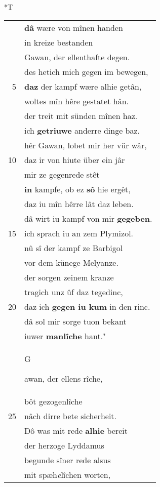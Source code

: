 \documentclass[8pt,a4paper,notitlepage]{article}
\begin{document}
\begin{table}[ht]
\hspace{0.5cm}
\begin{minipage}[t]{0.5\linewidth}
\small
\begin{center}*T
\end{center}
\begin{tabular}{rl}
 & \textbf{dâ} wære von mînen handen\\ 
 & in kreize bestanden\\ 
 & Gawan, der ellenthafte degen.\\ 
 & des hetich mich gegen im bewegen,\\ 
5 & \textbf{daz} der kampf wære alhie getân,\\ 
 & woltes mîn hêre gestatet hân.\\ 
 & der treit mit sünden mînen haz.\\ 
 & ich \textbf{getriuwe} anderre dinge baz.\\ 
 & hêr Gawan, lobet mir her vür wâr,\\ 
10 & daz ir von hiute über ein jâr\\ 
 & mir ze gegenrede stêt\\ 
 & \textbf{in} kampfe, ob ez \textbf{sô} hie ergêt,\\ 
 & daz iu mîn hêrre lât daz leben.\\ 
 & dâ wirt iu kampf von mir \textbf{gegeben}.\\ 
15 & ich sprach iu an zem Plymizol.\\ 
 & nû sî der kampf ze Barbigol\\ 
 & vor dem künege Melyanze.\\ 
 & der sorgen zeinem kranze\\ 
 & tragich unz ûf daz tegedinc,\\ 
20 & daz ich \textbf{gegen iu kum} in den rinc.\\ 
 & dâ sol mir sorge tuon bekant\\ 
 & iuwer \textbf{manlîche} hant."\\ 
 & \begin{large}G\end{large}awan, der ellens rîche,\\ 
 & bôt gezogenlîche\\ 
25 & nâch dirre bete sicherheit.\\ 
 & Dô was mit rede \textbf{alhie} bereit\\ 
 & der herzoge Lyddamus\\ 
 & begunde sîner rede alsus\\ 
 & mit spæh\textit{e}lîchen worten,\\ 

\end{tabular}
\end{minipage}
\end{table}
\end{document}
